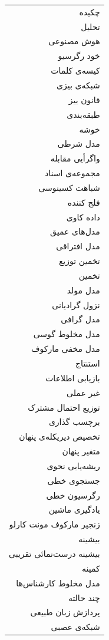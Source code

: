 \begin{table}[h]
\begin{minipage}{0.5\textwidth}
	\begin{tabular}{r}
	چکیده\\
	تحلیل\\
	هوش مصنوعی\\
	خود رگرسیو\\
	کیسه‌ی کلمات\\
	شبکه‌ی بیزی\\
	قانون بیز\\
	طبقه‌بندی\\
	خوشه\\
	مدل شرطی\\
	واگرأیی مقابله\\
	مجموعه‌ی اسناد\\
	شباهت کسینوسی\\
	فلج کننده\\
	داده کاوی\\
	مدل‌های عمیق\\
	مدل افتراقی\\
	تخمین توزیع\\
	تخمین\\
	مدل مولد\\
	نزول گرادیانی\\
	مدل گرافی\\
	مدل مخلوط گوسی\\
	مدل مخفی‌ مارکوف\\
	استنتاج\\
	بازیابی اطلاعات\\
	غیر عملی\\
	توزیع احتمال مشترک\\
	برچسب گذاری\\
	تخصیص دیریکله‌ی پنهان\\
	متغیر پنهان\\
	ریشه‌یابی‌ نحوی\\
	جستجوی خطی\\
	رگرسیون خطی\\
	یادگیری ماشین\\
	زنجیر مارکوف مونت کارلو\\
	بیشینه\\
	بیشینه درست‌نمائی تقریبی\\
	کمینه\\
	مدل مخلوط کارشناس‌ها\\
	چند حالته\\
	پردازش زبان طبیعی\\
	شبکه‌ی عصبی\\
	

\end{tabular}
\end{minipage}
\end{table}
